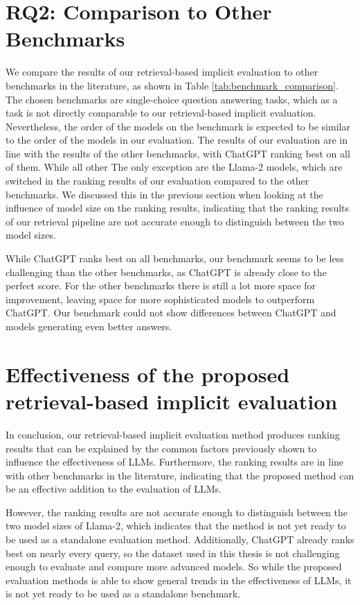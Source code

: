\section{RQ2: Comparison to Other Benchmarks}
We compare the results of our retrieval-based implicit evaluation to other benchmarks in the literature, as shown in Table \ref{tab:benchmark_comparison}.
The chosen benchmarks are single-choice question answering tasks, which as a task is not directly comparable to our retrieval-based implicit evaluation.
Nevertheless, the order of the models on the benchmark is expected to be similar to the order of the models in our evaluation.
The results of our evaluation are in line with the results of the other benchmarks, with ChatGPT ranking best on all of them.
While all other
The only exception are the Llama-2 models, which are switched in the ranking results of our evaluation compared to the other benchmarks.
We discussed this in the previous section when looking at the influence of model size on the ranking results, indicating that the ranking results of our retrieval pipeline are not accurate enough to distinguish between the two model sizes.

While ChatGPT ranks best on all benchmarks, our benchmark seems to be less challenging than the other benchmarks, as ChatGPT is already close to the perfect score.
For the other benchmarks there is still a lot more space for improvement, leaving space for more sophisticated models to outperform ChatGPT.
Our benchmark could not show differences between ChatGPT and models generating even better answers.

\section{Effectiveness of the proposed retrieval-based implicit evaluation}
In conclusion, our retrieval-based implicit evaluation method produces ranking results that can be explained by the common factors previously shown to influence the effectiveness of LLMs.
Furthermore, the ranking results are in line with other benchmarks in the literature, indicating that the proposed method can be an effective addition to the evaluation of LLMs.

However, the ranking results are not accurate enough to distinguish between the two model sizes of Llama-2, which indicates that the method is not yet ready to be used as a standalone evaluation method.
Additionally, ChatGPT already ranks best on nearly every query, so the dataset used in this thesis is not challenging enough to evaluate and compare more advanced models.
So while the proposed evaluation methods is able to show general trends in the effectiveness of LLMs, it is not yet ready to be used as a standalone benchmark.

